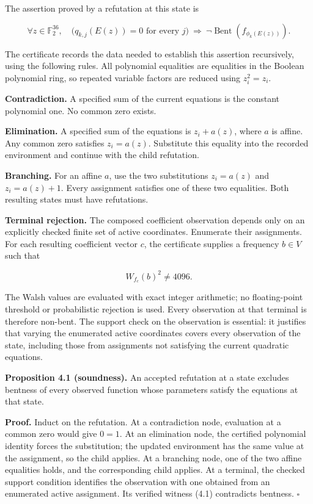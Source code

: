 \documentclass[11pt,a4paper]{article}
\begin{document}
The assertion proved by a refutation at this state is

\[
\forall z\in\mathbb F_2^{36},\quad
\bigl(q_{k,j}(E(z))=0\text{ for every }j\bigr)
\ \Longrightarrow\ \neg\operatorname{Bent}(f_{\phi_k(E(z))}).
\]

The certificate records the data needed to establish this assertion recursively, using the following rules. All polynomial equalities are equalities in the Boolean polynomial ring, so repeated variable factors are reduced using $z_i^2=z_i$.

\textbf{Contradiction.} A specified sum of the current equations is the constant polynomial one. No common zero exists.

\textbf{Elimination.} A specified sum of the equations is $z_i+a(z)$, where $a$ is affine. Any common zero satisfies $z_i=a(z)$. Substitute this equality into the recorded environment and continue with the child refutation.

\textbf{Branching.} For an affine $a$, use the two substitutions $z_i=a(z)$ and $z_i=a(z)+1$. Every assignment satisfies one of these two equalities. Both resulting states must have refutations.

\textbf{Terminal rejection.} The composed coefficient observation depends only on an explicitly checked finite set of active coordinates. Enumerate their assignments. For each resulting coefficient vector $c$, the certificate supplies a frequency $b\in V$ such that

\[
W_{f_c}(b)^2\ne4096. \tag{4.1}
\]

The Walsh values are evaluated with exact integer arithmetic; no floating-point threshold or probabilistic rejection is used. Every observation at that terminal is therefore non-bent. The support check on the observation is essential: it justifies that varying the enumerated active coordinates covers every observation of the state, including those from assignments not satisfying the current quadratic equations.

\textbf{Proposition 4.1 (soundness).} An accepted refutation at a state excludes bentness of every observed function whose parameters satisfy the equations at that state.

\textbf{Proof.} Induct on the refutation. At a contradiction node, evaluation at a common zero would give $0=1$. At an elimination node, the certified polynomial identity forces the substitution; the updated environment has the same value at the assignment, so the child applies. At a branching node, one of the two affine equalities holds, and the corresponding child applies. At a terminal, the checked support condition identifies the observation with one obtained from an enumerated active assignment. Its verified witness (4.1) contradicts bentness. \hfill$\square$
\end{document}
